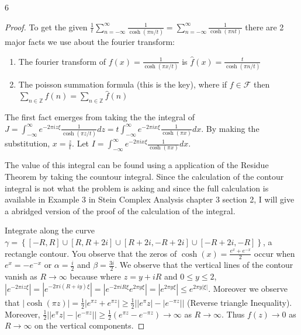 \documentclass{article}
\newcommand{\Z}{\mathbb{Z}}
\newcommand{\abs}[1]{\left\lvert #1\right\rvert}
\begin{document}
\bigskip

\begin{PROB}{6}\label{Problem 6.}
\end{PROB}
\begin{proof}
    To get the given $\frac{1}{t} \sum_{n = -\infty}^{\infty} \frac{1}{\cosh(\pi n / t)} = \sum_{n = -\infty}^{\infty} \frac{1}{\cosh(\pi n t)}$ there are 2 major facts we use about the fourier transform:
    
    \begin{enumerate}
        \item The fourier transform of $f(x) = \frac{1}{\cosh(\pi x / t)}$ is $\hat{f}(x) = \frac{t}{\cosh(\pi n / t)}$
        \item The poisson summation formula (this is the key), where if $f \in \mathscr{F}$ then $\sum_{n \in \Z} f(n) = \sum_{n \in \Z} \hat{f}(n)$  
    \end{enumerate}
    
    
    The first fact emerges from taking the the integral of $J = \int_{-\infty}^{\infty} e^{-2 \pi i z \xi} \frac{1}{\cosh(\pi z / t)}dz = t\int_{-\infty}^{\infty} e^{-2 \pi i x \xi} \frac{1}{\cosh(\pi x)}dx$. By making the substitution, $x = \frac{z}{t}$. Let $I = \int_{-\infty}^{\infty} e^{-2 \pi i x \xi} \frac{1}{\cosh(\pi x)}dx$.
    
    The value of this integral can be found using a application of the Residue Theorem by taking the countour integral. Since the calculation of the contour integral is not what the problem is asking and since the full calculation is available in Example 3 in Stein Complex Analysis chapter 3 section 2, I will give a abridged version of the proof of the calculation of the integral.

    Integrate along the curve $\gamma = \left\{ [-R, R] \cup [R, R + 2i] \cup [R + 2i, -R + 2i] \cup [-R + 2i, -R] \right\}$, a rectangle contour. You observe that the zeros of $\cosh(x) = \frac{e^x + e^{-x}}{2}$ occur when $e^x = -e^{-x}$ or $\alpha = \frac{i}{2}$ and $\beta = \frac{3i}{2}$. We observe that the vertical lines of the contour vanish as $R \to \infty$ because where $z = y + iR$ and $0 \leq y \leq 2$, $\abs{e^{-2 \pi i z \xi}} = \abs{e^{-2 \pi i (R + iy) \xi}} = \abs{e^{-2 \pi i R \xi}e^{2 \pi y \xi}} = \abs{e^{2 \pi y \xi}} \leq e^{2 \pi y \abs{\xi}}$. Moreover we observe that $\abs{\cosh(\pi z)} = \frac{1}{2}\abs{e^{\pi z} + e^{\pi z} } \geq \frac{1}{2} \abs{\abs{e^\pi z} - \abs{e^{-\pi z}}}$ (Reverse triangle Inequality). Moreover, $\frac{1}{2}\abs{\abs{e^\pi z} - \abs{e^{-\pi z}}} \geq \frac{1}{2}(e^{\pi z} - e^{-\pi z}) \to \infty$ as $R \to \infty$. Thus $f(z) \to 0$ as $R \to \infty$ on the vertical components.      
    

\end{proof}
\end{document}
